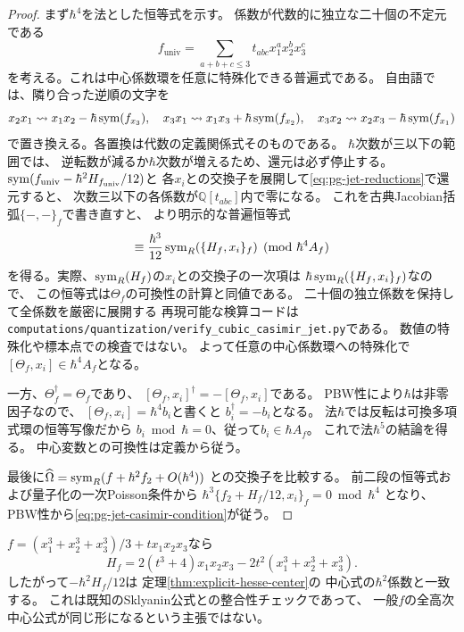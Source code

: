 \begin{proof}
まず$\hbar^4$を法とした恒等式を示す。
係数が代数的に独立な二十個の不定元である
\begin{equation}
 f_{\mathrm{univ}}=\sum_{a+b+c\le3}
 t_{abc}x_1^a x_2^b x_3^c
\end{equation}
を考える。これは中心係数環を任意に特殊化できる普遍式である。
自由語では、隣り合った逆順の文字を
\begin{equation}
 x_2x_1\rightsquigarrow x_1x_2-\hbar\operatorname{sym}(f_{x_3}),\quad
 x_3x_1\rightsquigarrow x_1x_3+\hbar\operatorname{sym}(f_{x_2}),\quad
 x_3x_2\rightsquigarrow x_2x_3-\hbar\operatorname{sym}(f_{x_1})
 \label{eq:pg-jet-reductions}
\end{equation}
で置き換える。各置換は代数の定義関係式そのものである。
$\hbar$次数が三以下の範囲では、
逆転数が減るか$\hbar$次数が増えるため、還元は必ず停止する。
$\operatorname{sym}(f_{\mathrm{univ}}-\hbar^2H_{f_{\mathrm{univ}}}/12)$と
各$x_i$との交換子を展開して\eqref{eq:pg-jet-reductions}で還元すると、
次数三以下の各係数が$\mathbb Q[t_{abc}]$内で零になる。
これを古典Jacobian括弧$\{-,-\}_f$で書き直すと、
より明示的な普遍恒等式
\begin{equation}
 [\sym_R(f),x_i]\equiv
 \frac{\hbar^3}{12}\sym_R(\{H_f,x_i\}_f)
 \pmod{\hbar^4 A_f}
 \label{eq:pg-jet-hessian-identity}
\end{equation}
を得る。実際、$\operatorname{sym}_R(H_f)$の$x_i$との交換子の一次項は
$\hbar\operatorname{sym}_R(\{H_f,x_i\}_f)$なので、
この恒等式は$\Theta_f$の可換性の計算と同値である。
二十個の独立係数を保持して全係数を厳密に展開する
再現可能な検算コードは
\texttt{computations/quantization/verify\_cubic\_casimir\_jet.py}である。
数値の特殊化や標本点での検査ではない。
よって任意の中心係数環への特殊化で
$[\Theta_f,x_i]\in\hbar^4A_f$となる。

一方、$\Theta_f^\dagger=\Theta_f$であり、
$[\Theta_f,x_i]^\dagger=-[\Theta_f,x_i]$である。
PBW性により$\hbar$は非零因子なので、
$[\Theta_f,x_i]=\hbar^4b_i$と書くと
$b_i^\dagger=-b_i$となる。
法$\hbar$では反転は可換多項式環の恒等写像だから
$b_i\bmod\hbar=0$、従って$b_i\in\hbar A_f$。
これで法$\hbar^5$の結論を得る。
中心変数との可換性は定義から従う。

最後に$\widehat\Omega=\operatorname{sym}_R(f+\hbar^2f_2+O(\hbar^4))$
との交換子を比較する。
前二段の恒等式および量子化の一次Poisson条件から
$\hbar^3\{f_2+H_f/12,x_i\}_f=0\bmod\hbar^4$
となり、PBW性から\eqref{eq:pg-jet-casimir-condition}が従う。
\end{proof}
\begin{remark}[Hesse公式との照合]
$f=(x_1^3+x_2^3+x_3^3)/3+t x_1x_2x_3$なら
\begin{equation}
 H_f=2(t^3+4)x_1x_2x_3-2t^2(x_1^3+x_2^3+x_3^3).
\end{equation}
したがって$-\hbar^2H_f/12$は
定理\ref{thm:explicit-hesse-center}の
中心式の$\hbar^2$係数と一致する。
これは既知のSklyanin公式との整合性チェックであって、
一般$f$の全高次中心公式が同じ形になるという主張ではない。
\end{remark}

